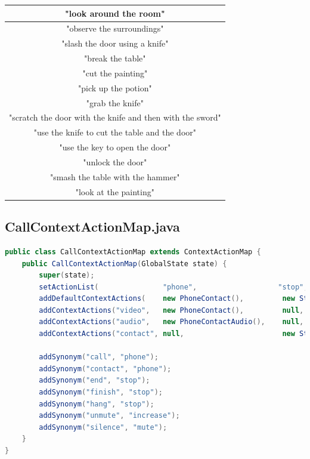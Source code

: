 \documentclass[11pt]{article}
\begin{document}
\begin{table}[H]
\centering
\begin{tabular}{|c|}
\hline
"look around the room"                    \\ \hline
"observe the surroundings"   \\ \hline
"slash the door using a knife"           \\ \hline
"break the table"  \\ \hline
"cut the painting"      \\ \hline
"pick up the potion"        \\ \hline
"grab the knife" \\ \hline
"scratch the door with the knife and then with the sword"                      \\ \hline
"use the knife to cut the table and the door"            \\ \hline
"use the key to open the door"                \\ \hline
"unlock the door"                    \\ \hline
"smash the table with the hammer"              \\ \hline
"look at the painting"             \\ \hline
\end{tabular}
\end{table}

\newpage
\subsection{CallContextActionMap.java}
\label{appendix:call-context-action-map}
\begin{lstlisting}[language=Java, caption=CallContextActionMap]
public class CallContextActionMap extends ContextActionMap {
    public CallContextActionMap(GlobalState state) {
        super(state);
        setActionList(               "phone",                   "stop",                 "mute",         "increase");
        addDefaultContextActions(    new PhoneContact(),         new StopCall(),         new Mute(),    new Unmute());
        addContextActions("video",   new PhoneContact(),         null,                   null,          null);
        addContextActions("audio",   new PhoneContactAudio(),    null,                   null,          null);
        addContextActions("contact", null,                       new StopCallContact(),  null,          null);

        addSynonym("call", "phone");
        addSynonym("contact", "phone");
        addSynonym("end", "stop");
        addSynonym("finish", "stop");
        addSynonym("hang", "stop");
        addSynonym("unmute", "increase");
        addSynonym("silence", "mute");
    }
}
\end{lstlisting}
\end{document}
